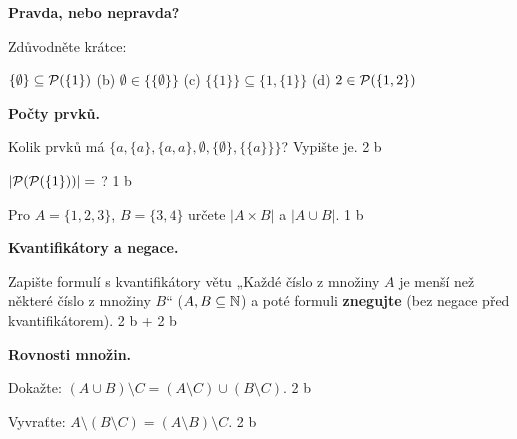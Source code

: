 \documentclass[11pt,a4paper]{article}
\begin{document}
\Needspace*{7.0cm}
\textbf{Pravda, nebo nepravda?}\par
Zdůvodněte krátce:
\begin{pol}
  \item $\{\emptyset\}\subseteq\mathcal P(\{1\})$ \qquad (b) $\emptyset\in\{\{\emptyset\}\}$ \qquad (c) $\{\{1\}\}\subseteq\{1,\{1\}\}$ \qquad (d) $2\in\mathcal P(\{1,2\})$
\end{pol}
\misto{3.6cm}

\Needspace*{7.8cm}
\textbf{Počty prvků.}\par
\begin{pol}
  \item Kolik prvků má $\{a,\{a\},\{a,a\},\emptyset,\{\emptyset\},\{\{a\}\}\}$? Vypište je. \hfill{\sffamily\footnotesize\color{muted}2 b}
  \item $|\mathcal P(\mathcal P(\{1\}))|=\ $? \hfill{\sffamily\footnotesize\color{muted}1 b}
  \item Pro $A=\{1,2,3\}$, $B=\{3,4\}$ určete $|A\times B|$ a $|A\cup B|$. \hfill{\sffamily\footnotesize\color{muted}1 b}
\end{pol}
\misto{4.4cm}

\Needspace*{7.6cm}
\textbf{Kvantifikátory a negace.}\par
Zapište formulí s kvantifikátory větu „Každé číslo z množiny $A$ je menší než některé číslo z množiny $B$“ ($A,B\subseteq\mathbb N$) a poté formuli \textbf{znegujte} (bez negace před kvantifikátorem). \hfill{\sffamily\footnotesize\color{muted}2 b + 2 b}
\misto{4.2cm}

\Needspace*{11.0cm}
\textbf{Rovnosti množin.}\par
\begin{pol}
  \item Dokažte: $(A\cup B)\setminus C=(A\setminus C)\cup(B\setminus C)$. \hfill{\sffamily\footnotesize\color{muted}2 b}
  \item Vyvraťte: $A\setminus(B\setminus C)=(A\setminus B)\setminus C$. \hfill{\sffamily\footnotesize\color{muted}2 b}
\end{pol}
\misto{7.6cm}
\end{document}
